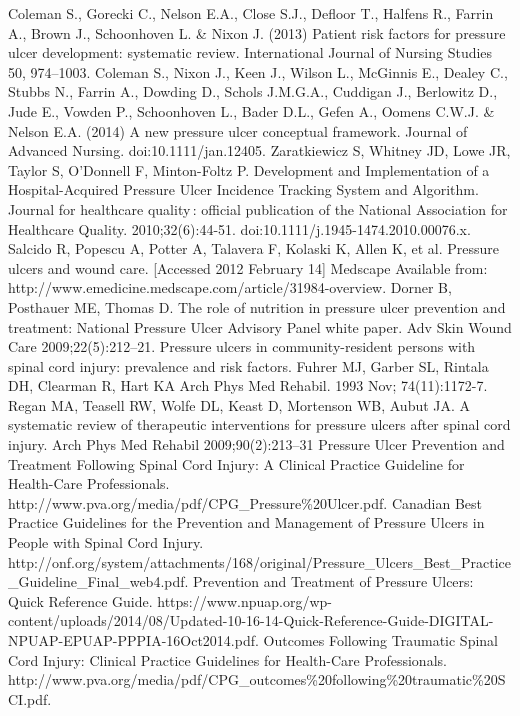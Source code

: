 \documentclass{amia}
\begin{document}
{\begin{thebibliography}{1}
Coleman S., Gorecki C., Nelson E.A., Close S.J., Defloor T., Halfens R., Farrin A., Brown J., Schoonhoven L. \& Nixon J. (2013) Patient risk factors for pressure ulcer development: systematic review. International Journal of Nursing Studies 50, 974–1003.
Coleman S., Nixon J., Keen J., Wilson L., McGinnis E., Dealey C., Stubbs N., Farrin A., Dowding D., Schols J.M.G.A., Cuddigan J., Berlowitz D., Jude E., Vowden P., Schoonhoven L., Bader D.L., Gefen A., Oomens C.W.J. \& Nelson E.A. (2014) A new pressure ulcer conceptual framework. Journal of Advanced Nursing. doi:10.1111/jan.12405.
Zaratkiewicz S, Whitney JD, Lowe JR, Taylor S, O’Donnell F, Minton-Foltz P. Development and Implementation of a Hospital-Acquired Pressure Ulcer Incidence Tracking System and Algorithm. Journal for healthcare quality : official publication of the National Association for Healthcare Quality. 2010;32(6):44-51. doi:10.1111/j.1945-1474.2010.00076.x.
Salcido R, Popescu A, Potter A, Talavera F, Kolaski K, Allen K, et al. Pressure ulcers and wound care. [Accessed 2012 February 14] Medscape Available from: http://www.emedicine.medscape.com/article/31984-overview.
Dorner B, Posthauer ME, Thomas D. The role of nutrition in pressure ulcer prevention and treatment: National Pressure Ulcer Advisory Panel white paper. Adv Skin Wound Care 2009;22(5):212–21.
Pressure ulcers in community-resident persons with spinal cord injury: prevalence and risk factors.
Fuhrer MJ, Garber SL, Rintala DH, Clearman R, Hart KA
Arch Phys Med Rehabil. 1993 Nov; 74(11):1172-7.
Regan MA, Teasell RW, Wolfe DL, Keast D, Mortenson WB, Aubut JA. A systematic review of therapeutic interventions for pressure ulcers after spinal cord injury. Arch Phys Med Rehabil 2009;90(2):213–31
Pressure Ulcer Prevention and Treatment Following Spinal Cord Injury: A Clinical Practice Guideline for Health-Care Professionals. http://www.pva.org/media/pdf/CPG\_Pressure\%20Ulcer.pdf.
Canadian Best Practice Guidelines for the Prevention and Management of Pressure Ulcers in People with Spinal Cord Injury. http://onf.org/system/attachments/168/original/Pressure\_Ulcers\_Best\_Practice\_Guideline\_Final\_web4.pdf.
Prevention and Treatment of Pressure Ulcers: Quick Reference Guide. https://www.npuap.org/wp-content/uploads/2014/08/Updated-10-16-14-Quick-Reference-Guide-DIGITAL-NPUAP-EPUAP-PPPIA-16Oct2014.pdf.
Outcomes Following Traumatic Spinal Cord Injury: Clinical Practice Guidelines for Health-Care Professionals. http://www.pva.org/media/pdf/CPG\_outcomes\%20following\%20traumatic\%20SCI.pdf.

\end{thebibliography}}
\end{document}
